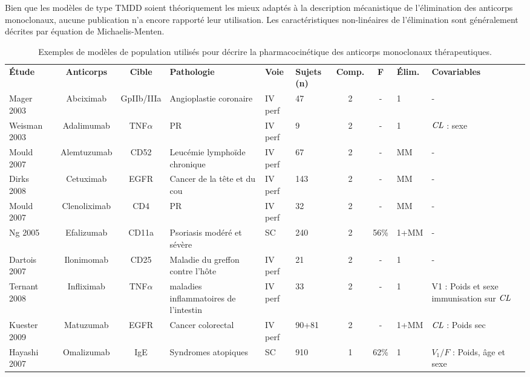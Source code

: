 Bien que les modèles de type TMDD soient théoriquement les mieux adaptés à la description mécanistique de l'élimination des anticorps monoclonaux, aucune publication n'a encore rapporté leur utilisation. Les caractéristiques non-linéaires de l'élimination sont généralement décrites par équation de Michaelis-Menten.  

\begin{table}[!ht]
  \centering
  \caption{Exemples de modèles de population utilisés pour décrire la pharmacocinétique des anticorps monoclonaux thérapeutiques.}
    \begin{tabular}{p{1.6cm}ccp{1.8cm}p{.8cm}p{.9cm}ccp{.9cm}l}
      &&&&&&&&& \\
      \hline
\textbf{Étude} & \textbf{Anticorps} & \textbf{Cible} & \textbf{Pathologie} & \textbf{Voie} & \textbf{Sujets (n)} & \textbf{Comp.} & \textbf{F} & \textbf{Élim.} & \textbf{Covariables} \\
      \hline
      \hline
      Mager 2003~\citep{REF65} & Abciximab & GpIIb/IIIa & Angioplastie coronaire & IV perf & 47 & 2 & - & 1 & - \\
      Weisman 2003~\citep{REF66} & Adalimumab & TNF$\alpha$ & PR & IV perf & 9 & 2 & - & 1 & $\operatorname{\textit{CL}}$ : sexe \\
      Mould 2007~\citep{REF67} & Alemtuzumab & CD52 & Leucémie lymphoïde chronique & IV perf & 67 & 2 & - & MM & - \\
      Dirks 2008~\citep{REF68} & Cetuximab & EGFR & Cancer de la tête et du cou & IV perf & 143 & 2 & - & MM & - \\
      Mould 2007~\citep{REF69} & Clenoliximab & CD4 & PR & IV perf & 32 & 2 & - & MM & - \\
      Ng 2005~\citep{REF50} & Efalizumab & CD11a & Psoriasis modéré et sévère & SC & 240 & 2 & 56\% & 1+MM & - \\
      Dartois 2007~\citep{REF70} & Ilonimomab & CD25 & Maladie du greffon contre l'hôte & IV perf & 21 & 2 & - & 1 & - \\
      Ternant 2008~\citep{REF71} & Infliximab & TNF$\alpha$ & maladies inflammatoires de l'intestin & IV perf & 33 & 2 & - & 1 & V1 : Poids et sexe immunisation sur $\operatorname{\textit{CL}}$ \\
      Kuester 2009~\citep{REF72} & Matuzumab & EGFR & Cancer colorectal & IV perf & 90+81 & 2 & - & 1+MM & $\operatorname{\textit{CL}}$ : Poids sec \\
      Hayashi 2007~\citep{REF61} & Omalizumab & IgE & Syndromes atopiques & SC & 910 & 1 & 62\% & 1 & $V_1/F$ : Poids,  âge et sexe \\

\end{tabular}
\end{table}
